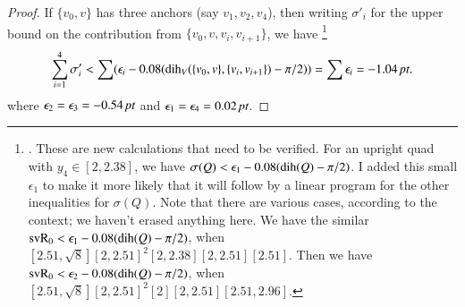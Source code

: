 \begin{proof}
If $\{v_0,v\}$ has three anchors (say $v_1,v_2,v_4$), then
writing $\sigma'_i$ for the upper bound on the contribution
from $\{v_0,v,v_i,v_{i+1}\}$, we have%
\footnote{.  These are new calculations that need to
be verified.  For an upright quad with $y_4\in[2,2.38]$, we
have $\sigma(Q) < \epsilon_1 -0.08(\operatorname{dih}(Q)-\pi/2)$.  I added
this small $\epsilon_1$ to make it more likely that it will follow
by a linear program for the other inequalities for $\sigma(Q)$.
Note that there are various cases, according to the context; we
haven't erased anything here.  We have the similar
  ${\operatorname{svR}}_0 < \epsilon_1 -0.08(\operatorname{dih}(Q)-\pi/2)$,
when $[2.51,\sqrt8][2,2.51]^2[2,2.38][2,2.51][2.51]$.  Then we
have ${\operatorname{svR}}_0 < \epsilon_2  -0.08(\operatorname{dih}(Q)-\pi/2)$,
when $[2.51,\sqrt8][2,2.51]^2[2][2,2.51][2.51,2.96]$.
}
  $$
  \sum_{i=1}^4\sigma'_i < 
  \sum (\epsilon_i -0.08 (\operatorname{dih}_V(\{v_0,v\},\{v_i,v_{i+1}\})-\pi/2))
  = \sum\epsilon_i = -1.04\,\hbox{\it pt}.
  $$
where $\epsilon_2=\epsilon_3 = -0.54\,\hbox{\it pt}$ and $\epsilon_1=\epsilon_4 =
0.02\,\hbox{\it pt}$.
\end{proof}

